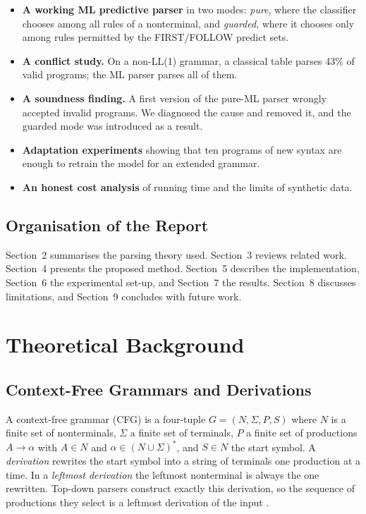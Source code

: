 \documentclass[12pt,a4paper]{article}
\begin{document}
\begin{itemize}
    \item \textbf{A working ML predictive parser} in two modes: \emph{pure},
    where the classifier chooses among all rules of a nonterminal, and
    \emph{guarded}, where it chooses only among rules permitted by the
    FIRST/FOLLOW predict sets.
    \item \textbf{A conflict study.} On a non-LL(1) grammar, a classical table
    parses 43\% of valid programs; the ML parser parses all of them.
    \item \textbf{A soundness finding.} A first version of the pure-ML parser
    wrongly accepted invalid programs. We diagnosed the cause and removed it,
    and the guarded mode was introduced as a result.
    \item \textbf{Adaptation experiments} showing that ten programs of new
    syntax are enough to retrain the model for an extended grammar.
    \item \textbf{An honest cost analysis} of running time and the limits of
    synthetic data.
\end{itemize}

\subsection{Organisation of the Report}

Section~2 summarises the parsing theory used. Section~3 reviews related work.
Section~4 presents the proposed method. Section~5 describes the
implementation, Section~6 the experimental set-up, and Section~7 the results.
Section~8 discusses limitations, and Section~9 concludes with future work.

\newpage
\section{Theoretical Background}

\subsection{Context-Free Grammars and Derivations}

A context-free grammar (CFG) is a four-tuple $G=(N,\Sigma,P,S)$ where $N$ is a
finite set of nonterminals, $\Sigma$ a finite set of terminals, $P$ a finite
set of productions $A\rightarrow\alpha$ with $A\in N$ and
$\alpha\in(N\cup\Sigma)^{*}$, and $S\in N$ the start symbol. A
\emph{derivation} rewrites the start symbol into a string of terminals one
production at a time. In a \emph{leftmost derivation} the leftmost nonterminal
is always the one rewritten. Top-down parsers construct exactly this
derivation, so the sequence of productions they select is a leftmost derivation
of the input \cite{hopcroft2006}.
\end{document}
